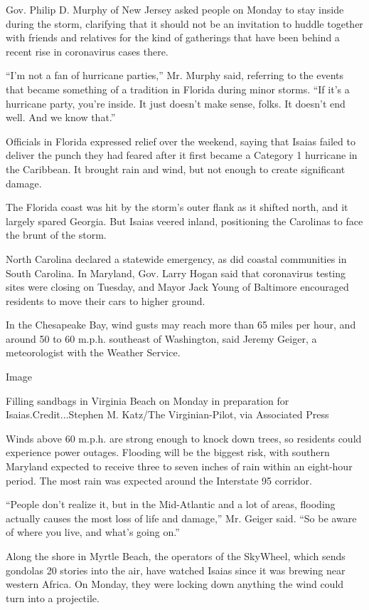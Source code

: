 Gov. Philip D. Murphy of New Jersey asked people on Monday to stay
inside during the storm, clarifying that it should not be an invitation
to huddle together with friends and relatives for the kind of gatherings
that have been behind a recent rise in coronavirus cases there.

``I'm not a fan of hurricane parties,'' Mr. Murphy said, referring to
the events that became something of a tradition in Florida during minor
storms. ``If it's a hurricane party, you're inside. It just doesn't make
sense, folks. It doesn't end well. And we know that.''

Officials in Florida expressed relief over the weekend, saying that
Isaias failed to deliver the punch they had feared after it first became
a Category 1 hurricane in the Caribbean. It brought rain and wind, but
not enough to create significant damage.

The Florida coast was hit by the storm's outer flank as it shifted
north, and it largely spared Georgia. But Isaias veered inland,
positioning the Carolinas to face the brunt of the storm.

North Carolina declared a statewide emergency, as did coastal
communities in South Carolina. In Maryland, Gov. Larry Hogan said that
coronavirus testing sites were closing on Tuesday, and Mayor Jack Young
of Baltimore encouraged residents to move their cars to higher ground.

In the Chesapeake Bay, wind gusts may reach more than 65 miles per hour,
and around 50 to 60 m.p.h. southeast of Washington, said Jeremy Geiger,
a meteorologist with the Weather Service.

Image

Filling sandbags in Virginia Beach on Monday in preparation for
Isaias.Credit...Stephen M. Katz/The Virginian-Pilot, via Associated
Press

Winds above 60 m.p.h. are strong enough to knock down trees, so
residents could experience power outages. Flooding will be the biggest
risk, with southern Maryland expected to receive three to seven inches
of rain within an eight-hour period. The most rain was expected around
the Interstate 95 corridor.

``People don't realize it, but in the Mid-Atlantic and a lot of areas,
flooding actually causes the most loss of life and damage,'' Mr. Geiger
said. ``So be aware of where you live, and what's going on.''

Along the shore in Myrtle Beach, the operators of the SkyWheel, which
sends gondolas 20 stories into the air, have watched Isaias since it was
brewing near western Africa. On Monday, they were locking down anything
the wind could turn into a projectile.

